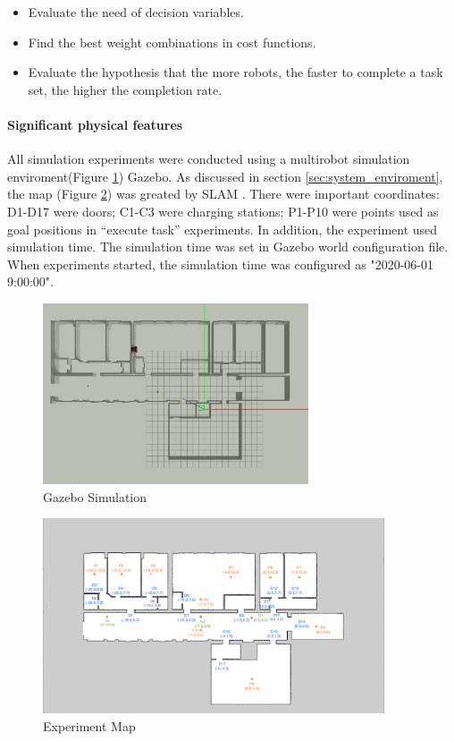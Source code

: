 \begin{itemize}
	\item Evaluate the need of decision variables.
	\item Find the best weight combinations in cost functions.
	\item Evaluate the hypothesis that the more robots, the faster to complete a task set, the higher the completion rate.
\end{itemize}

\paragraph{Significant physical features}
All simulation experiments were conducted using a multirobot simulation enviroment(Figure \ref{fig:gazebo_model}) Gazebo. As discussed in section \ref{sec:system_enviroment}, the map (Figure \ref{fig:exp_map}) was greated by SLAM \cite{slam}. There were important coordinates: D1-D17 were doors; C1-C3 were charging stations; P1-P10 were points used as goal positions in ``execute task'' experiments.
In addition, the experiment used simulation time. The simulation time was set in Gazebo world configuration file. When experiments started, the simulation time was configured as "2020-06-01 9:00:00".

\begin{figure}[htbp]
	\centering
	\includegraphics[width = 0.7\textwidth]{content/images/ch5/gazebo_model.png}
	\caption{Gazebo Simulation}
	\label{fig:gazebo_model}
\end{figure}

\begin{figure}[htbp]
    \centering
    \includegraphics[width = 0.9\textwidth]{content/images/ch5/door_station_points.png}
    \caption{Experiment Map}
    \label{fig:exp_map}
\end{figure}

